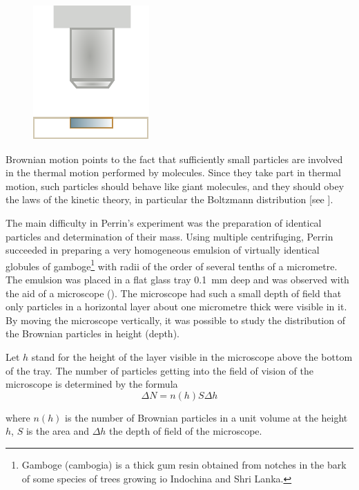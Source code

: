 \begin{figure}[t]
	\begin{center}
		\includegraphics[scale=1.0]{figures/ch_11/fig_11_23.pdf}
		\caption[]{}
		\label{fig:11_23}
	\end{center}
	\vspace{-0.8cm}
\end{figure}

Brownian motion points to the fact that sufficiently small particles are involved in the thermal motion performed by molecules. Since they take part in thermal motion, such particles should behave like giant molecules, and they should obey the laws of the kinetic theory, in particular the Boltzmann distribution [see ].

The main difficulty in Perrin's experiment was the preparation of identical particles and determination of their mass. Using multiple centrifuging, Perrin succeeded in preparing a very homogeneous emulsion of virtually identical globules of gamboge\footnote{Gamboge (cambogia) is a thick gum resin obtained from notches in the bark of some species of trees growing io Indochina and Shri Lanka.} with radii of the order of several tenths of a micrometre. The emulsion was placed in a flat glass tray \SI{0.1}{\milli\metre} deep and was observed with the aid of a microscope (). The microscope had such a small depth of field that only particles in a horizontal layer about one micrometre thick were visible in it. By moving the microscope vertically, it was possible to study the distribution of the Brownian particles in height (depth).

Let $h$ stand for the height of the layer visible in the microscope above the bottom of the tray. The number of particles getting into the field of vision of the microscope is determined by the formula
\begin{equation*}
	\Delta N = n(h) S \Delta h
\end{equation*}

\noindent
where $n(h)$ is the number of Brownian particles in a unit volume at the height $h$, $S$ is the area and $\Delta h$ the depth of field of the microscope.

